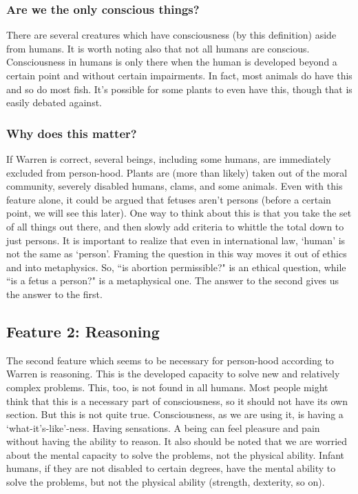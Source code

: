 \subsubsection{Are we the only conscious things?}

There are several creatures which have consciousness (by this definition) aside from humans. It is worth noting also that not all humans are conscious. Consciousness in humans is only there when the human is developed beyond a certain point and without certain impairments. In fact, most animals do have this and so do most fish. It's possible for some plants to even have this, though that is easily debated against.

\subsubsection{Why does this matter?}

If Warren is correct, several beings, including some humans, are immediately excluded from person-hood. Plants are (more than likely) taken out of the moral community, severely disabled humans, clams, and some animals. Even with this feature alone, it could be argued that fetuses aren't persons (before a certain point, we will see this later). One way to think about this is that you take the set of all things out there, and then slowly add criteria to whittle the total down to just persons. It is important to realize that even in international law, `human' is not the same as `person'.  Framing the question in this way moves it out of ethics and into metaphysics. So, ``is abortion permissible?" is an ethical question, while ``is a fetus a person?" is a metaphysical one. The answer to the second gives us the answer to the first.

\subsection{Feature 2: Reasoning}

The second feature which seems to be necessary for person-hood according to Warren is reasoning. This is the developed capacity to solve new and relatively complex problems. This, too, is not found in all humans. Most people might think that this is a necessary part of consciousness, so it should not have its own section. But this is not quite true. Consciousness, as we are using it, is having a `what-it's-like'-ness. Having sensations. A being can feel pleasure and pain without having the ability to reason. It also should be noted that we are worried about the mental capacity to solve the problems, not the physical ability. Infant humans, if they are not disabled to certain degrees, have the mental ability to solve the problems, but not the physical ability (strength, dexterity, so on).

